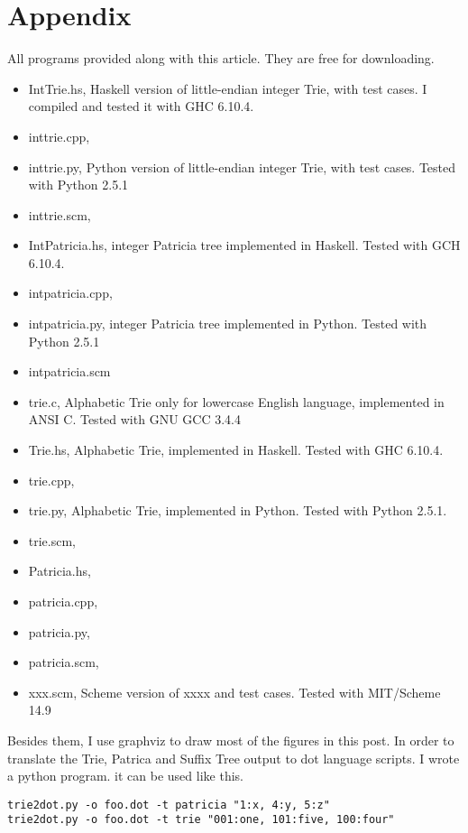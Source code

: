 \documentclass{article}
\begin{document}
\section{Appendix} \label{appendix}
All programs provided along with this article. They are free for downloading.
\begin{itemize}
\item IntTrie.hs, Haskell version of little-endian integer Trie, with test cases. I compiled
and tested it with GHC 6.10.4.
\item inttrie.cpp,
\item inttrie.py, Python version of little-endian integer Trie, with test cases. Tested
with Python 2.5.1
\item inttrie.scm,
\item IntPatricia.hs, integer Patricia tree implemented in
Haskell. Tested with GCH 6.10.4. 
\item intpatricia.cpp,
\item intpatricia.py, integer Patricia tree implemented in
Python. Tested with Python 2.5.1
\item intpatricia.scm
\item trie.c, Alphabetic Trie only for lowercase English language,
implemented in ANSI C. Tested with GNU GCC 3.4.4
\item Trie.hs, Alphabetic Trie, implemented in Haskell. Tested with
GHC 6.10.4.
\item trie.cpp,
\item trie.py, Alphabetic Trie, implemented in Python. Tested with
Python 2.5.1.
\item trie.scm,
\item Patricia.hs,
\item patricia.cpp,
\item patricia.py,
\item patricia.scm,
\item xxx.scm, Scheme version of xxxx and test cases. Tested
with MIT/Scheme 14.9
\end{itemize}

Besides them, I use graphviz to draw most of the figures in this post. In order to
translate the Trie, Patrica and Suffix Tree output to dot language scripts. I wrote a python program.
it can be used like this.

\begin{verbatim}
trie2dot.py -o foo.dot -t patricia "1:x, 4:y, 5:z"
trie2dot.py -o foo.dot -t trie "001:one, 101:five, 100:four"
\end{verbatim}
\end{document}
